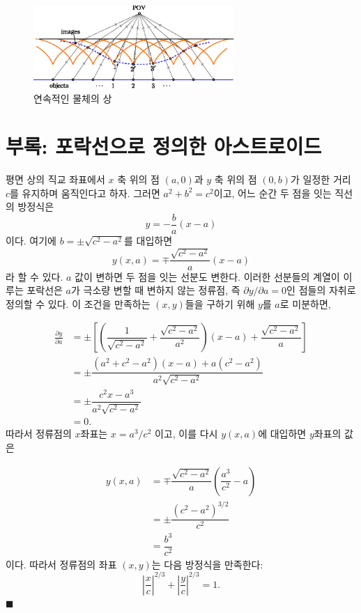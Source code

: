\documentclass[twocolumn]{article}
\begin{document}
\begin{figure}[ht]
	\centering
	\includegraphics*[width=3in]{figs/g240.eps}
	\caption{연속적인 물체의 상}
	\label{fig:extended_image}
\end{figure}

\appendix
\newcommand{\pd}[2]{{\frac{\partial #1}{\partial #2}}}
\newcommand{\ilpd}[2]{{{\partial #1}/{\partial #2}}}
\section*{부록: 포락선으로 정의한 아스트로이드}
평면 상의 직교 좌표에서 $x$ 축 위의 점  $(a, 0)$과 $y$ 축 위의 점 $(0, b)$가 일정한 거리 $c$를 유지하며 움직인다고 하자. 그러면 $a^2+b^2=c^2$이고, 어느 순간 두 점을 잇는 직선의 방정식은 
$$y=-\dfrac{b}{a}(x-a)$$
이다. 여기에 
$b=\pm \sqrt{c^2-a^2}$를 대입하면 
$$y(x, a) = \mp \dfrac{\sqrt{c^2-a^2}}{a}(x-a)$$
라 할 수 있다. 
$a$ 값이 변하면 두 점을 잇는 선분도 변한다. 이러한 선분들의 계열이 이루는 포락선은 $a$가 극소량 변할 때 변하지 않는 정류점, 즉
$\ilpd{y}{a} = 0$인 점들의 자취로 정의할 수 있다. 이 조건을 만족하는 $(x, y)$들을 구하기 위해 $y$를 $a$로 미분하면,

$$ \begin{aligned}
\pd{y}{a} &= \pm\left[\left( \dfrac{1}{\sqrt{c^2-a^2}}+\dfrac{\sqrt{c^2-a^2}}{a^2}\right) (x-a) + \dfrac{\sqrt{c^2-a^2}}{a} \right]\\
	&= \pm \dfrac{(a^2+c^2-a^2)(x-a)+a(c^2-a^2)}{a^2\sqrt{c^2-a^2}}\\
	&= \pm \dfrac{c^2 x - a^3}{a^2 \sqrt{c^2 - a^2}}\\
	&= 0.
\end{aligned}
$$
따라서 정류점의 $x$좌표는 $x = a^3/c^2$ 이고, 이를 다시 $y(x, a)$에 대입하면 $y$좌표의 값은

$$ \begin{aligned}
y(x, a) &= \mp \dfrac{\sqrt{c^2-a^2}}{a}\left(\dfrac{a^3}{c^2}-a\right)\\
	& = \pm \dfrac{\left( c^2- a^2 \right)^{3/2}}{c^2}\\
	& = \dfrac{b^3}{c^2}
\end{aligned}
$$
이다. 따라서 정류점의 좌표 $(x, y)$는 다음 방정식을 만족한다:
$$ \left|\dfrac{x}{c}\right|^{2/3} + \left|\dfrac{y}{c}\right|^{2/3} = 1. $$
$\blacksquare$

\end{document}
